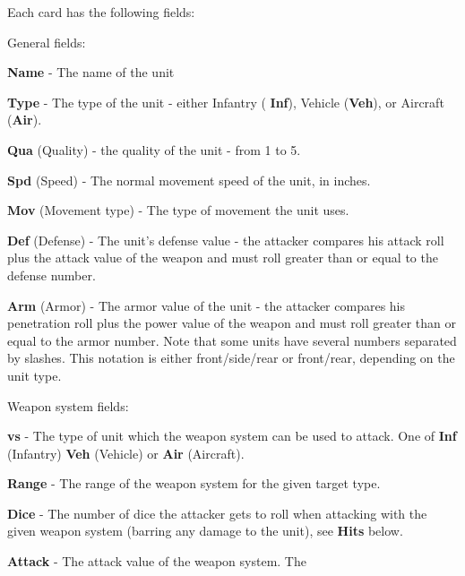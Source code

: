 \documentclass[12pt,titlepage]{article}
\begin{document}
  \begin{multicols}{2}

    Each card has the following fields:

    \begin{description}
    \item General fields:
      \begin{description}
        \item{\bf Name} - The name of the unit
        \item{\bf Type} - The type of the unit - either Infantry ({\bf
          Inf}), Vehicle ({\bf Veh}), or Aircraft ({\bf Air}).
        \item {\bf Qua} (Quality) - the quality of the unit - from 1
          to 5.
        \item {\bf Spd} (Speed) - The normal movement speed of the unit,
          in inches.
        \item {\bf Mov} (Movement type) - The type of movement the
          unit uses.
        \item {\bf Def} (Defense) - The unit's defense value - the
          attacker compares his attack roll plus the attack value of the
          weapon and must roll greater than or equal to the defense
          number.
        \item {\bf Arm} (Armor) - The armor value of the unit - the
          attacker compares his penetration roll plus the power value
          of the weapon and must roll greater than or equal to the armor
          number. Note that some units have several numbers separated by
          slashes. This notation is either front/side/rear or
          front/rear, depending on the unit type.
      \end{description}
    \item Weapon system fields:
      \begin{description}
      \item {\bf vs} - The type of unit which the weapon system can be
        used to attack. One of {\bf Inf} (Infantry) {\bf Veh}
        (Vehicle) or {\bf Air} (Aircraft).
      \item {\bf Range} - The range of the weapon system for the given
        target type.
      \item {\bf Dice} - The number of dice the attacker gets to roll
        when attacking with the given weapon system (barring any
        damage to the unit), see {\bf Hits} below. 
      \item {\bf Attack} - The attack value of the weapon system. The

\end{description}
\end{description}
\end{multicols}
\end{document}
